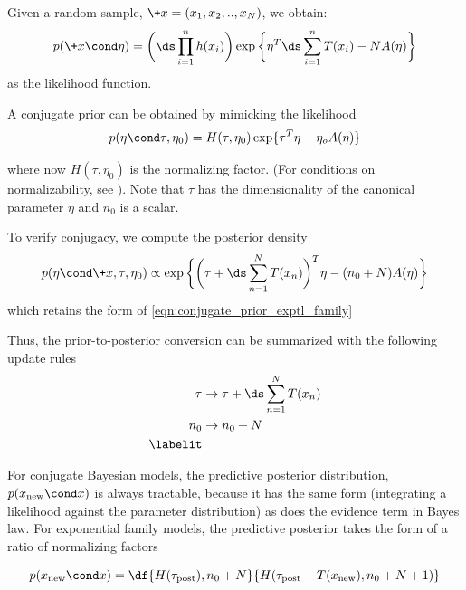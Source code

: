 \documentclass{article} %
\begin{document}
Given a random sample, $\+x=(x_1, x_2, .., x_N)$, we obtain:
\[ p(\+x \cond \eta) = \bigg( \ds\prod_{i=1}^n h(x_i)  \bigg) \exp \bigg\{ \eta^T  \ds\sum_{i=1}^n T(x_i) - N A(\eta) \bigg\} \]
as the likelihood function.

A conjugate prior can be obtained by mimicking the likelihood
\begin{equation}
p (\eta \cond \tau, \eta_0) = H(\tau, \eta_0) \exp \{ \tau^T \eta - \eta_o A(\eta)\}
\label{eqn:conjugate_prior_exptl_family}
\end{equation}

where now $H(\tau, \eta_0)$ is the normalizing factor.  (For conditions on normalizability, see \cite{jordan}).   Note that $\tau$ has the dimensionality of the canonical parameter $\eta$ and $n_0$ is a scalar.

To verify conjugacy, we compute the posterior density
\[ p (\eta \cond \+x, \tau, \eta_0)  \propto \exp \bigg\{ \bigg( \tau + \ds\sum_{n=1}^N  T(x_n) \bigg)^T \eta - (n_0 + N) A(\eta) \bigg\} \]
which retains the form of \eqref{eqn:conjugate_prior_exptl_family}

Thus, the prior-to-posterior conversion can be summarized with the following update rules
\begin{align*}
\tau & \to \tau + \ds\sum_{n=1}^N T(x_n) \\
n_0 & \to  n_0 + N \\
\labelit \label{eqn:general_formalism_prior_to_posterior_conversion}
\end{align*}

For conjugate Bayesian models, the predictive posterior distribution, $p(x_{\text{new}} \cond x)$ is always tractable, because it has the same form (integrating a likelihood against the parameter distribution) as does the evidence term in Bayes law.   For exponential family models, the predictive posterior takes the form of a ratio of normalizing factors

\begin{equation}
p(x_{\text{new}} \cond x) = \df{H(\tau_{\text{post}}), n_0 + N}{H(\tau_{\text{post}} + T(x_{\text{new}}), n_0 + N + 1)}
\label{eqn:predictive_posterior_exptl_family}
\end{equation}

\end{document}
